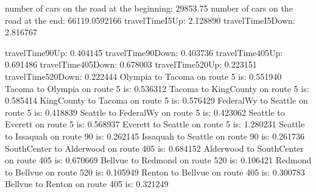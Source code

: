 number of cars on the road at the beginning:
29853.75
number of cars on the road at the end:
66119.0592166
travelTimeI5Up: 2.128890
travelTimeI5Down: 2.816767

travelTime90Up: 0.404145
travelTime90Down: 0.403736
travelTime405Up: 0.691486
travelTime405Down: 0.678003
travelTime520Up: 0.223151
travelTime520Down: 0.222444
Olympia to Tacoma on route 5 is: 0.551940
Tacoma to Olympia on route 5 is: 0.536312
Tacoma to KingCounty on route 5 is: 0.585414
KingCounty to Tacoma on route 5 is: 0.576429
FederalWy to Seattle on route 5 is: 0.418839
Seattle to FederalWy on route 5 is: 0.423062
Seattle to Everett on route 5 is: 0.568937
Everett to Seattle on route 5 is: 1.280231
Seattle to Issaquah on route 90 is: 0.262145
Issaquah to Seattle on route 90 is: 0.261736
SouthCenter to Alderwood on route 405 is: 0.684152
Alderwood to SouthCenter on route 405 is: 0.670669
Bellvue to Redmond on route 520 is: 0.106421
Redmond to Bellvue on route 520 is: 0.105949
Renton to Bellvue on route 405 is: 0.300783
Bellvue to Renton on route 405 is: 0.321249